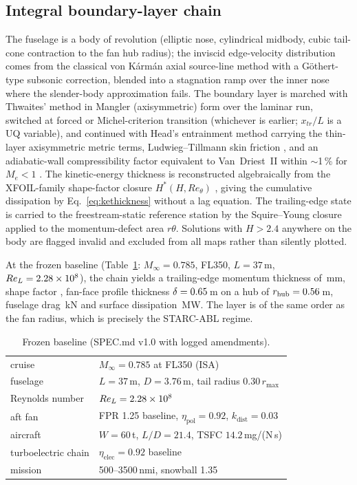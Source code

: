 \documentclass[10pt]{article}
\begin{document}
\subsection{Integral boundary-layer chain}\label{sec:ibl}

The fuselage is a body of revolution (elliptic nose, cylindrical midbody,
cubic tail-cone contraction to the fan hub radius); the inviscid
edge-velocity distribution comes from the classical von K\'arm\'an axial
source-line method with a G\"othert-type subsonic correction, blended into a
stagnation ramp over the inner nose where the slender-body approximation
fails. The boundary layer is marched with Thwaites' method
\citep{thwaites1949} in Mangler (axisymmetric) form \citep{mangler1948}
over the laminar run, switched at forced or Michel-criterion transition
\citep{michel1951} (whichever is earlier;
$x_{tr}/L$ is a UQ variable), and continued with Head's entrainment method
\citep{head1958, cebeci1977} carrying the thin-layer axisymmetric metric
terms, Ludwieg--Tillmann skin friction \citep{ludwieg1950}, and an
adiabatic-wall compressibility factor equivalent to Van~Driest~II within
$\sim$1\,\% for $M_e<1$ \citep{vandriest1956}. The kinetic-energy thickness
is reconstructed algebraically from the XFOIL-family shape-factor closure
$H^*(H, Re_\theta)$ \citep{drela1987}, giving the cumulative dissipation by
Eq.~\eqref{eq:kethickness} without a lag equation. The trailing-edge state
is carried to the freestream-static reference station by the Squire--Young
closure \citep{squireyoung1938} applied to the momentum-defect area
$r\theta$. Solutions with $H>2.4$ anywhere on the body are flagged invalid
and excluded from all maps rather than silently plotted.

At the frozen baseline (Table~\ref{tab:baseline}: $M_\infty=0.785$,
FL350, $L=37$\,m, $Re_L=2.28 \times 10^{8}$), the chain yields a trailing-edge momentum
thickness of \numthetaTE\,mm, shape factor \numHTE, fan-face profile
thickness $\delta=0.65$\,m on a hub of $r_{\mathrm{hub}}
=0.56$\,m, fuselage drag \numDragFus\,kN and surface dissipation
\numPhiSurf\,MW. The layer is of the same order as the fan radius,
which is precisely the STARC-ABL regime.

\begin{table}[t]
\centering\small
\caption{Frozen baseline (SPEC.md v1.0 with logged amendments).}
\label{tab:baseline}
\begin{tabular}{ll}
\toprule
cruise & $M_\infty=0.785$ at FL350 (ISA) \\
fuselage & $L=37$\,m, $D=3.76$\,m, tail radius $0.30\,r_{\max}$ \\
Reynolds number & $Re_L = 2.28 \times 10^{8}$ \\
aft fan & FPR 1.25 baseline, $\eta_{\mathrm{pol}}=0.92$, $k_{\mathrm{dist}}=0.03$ \\
aircraft & $W=60$\,t, $L/D=21.4$, TSFC $14.2$\,mg/(N\,s) \\
turboelectric chain & $\eta_{\mathrm{elec}}=0.92$ baseline \\
mission & 500--3500\,nmi, snowball 1.35 \\
\bottomrule
\end{tabular}
\end{table}
\end{document}

